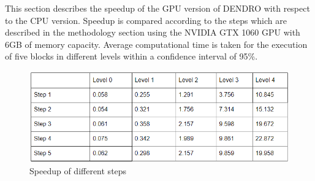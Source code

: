 This section describes the speedup of the GPU version of DENDRO with respect to the CPU version. Speedup is compared according to the steps which are described in the methodology section using the NVIDIA GTX 1060 GPU with 6GB of memory capacity. Average computational time is taken for the execution of five blocks in different levels within a confidence interval of 95\%.

\begin{figure}
  \includegraphics[width=\linewidth]{./images/table.png}
  \caption{Speedup of different steps}
  \label{fig:table}
\end{figure}




